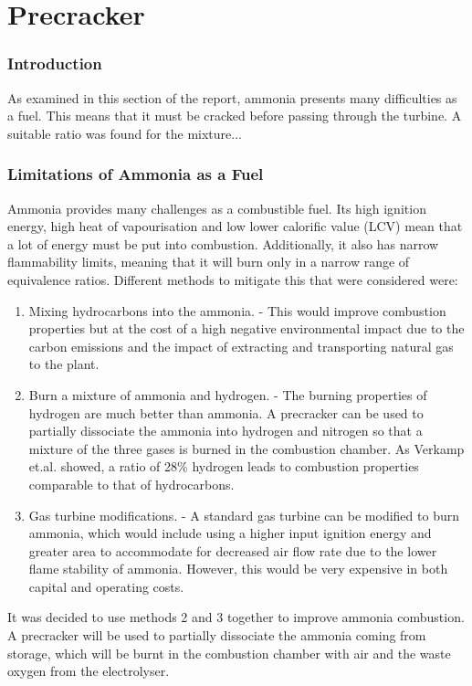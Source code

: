 \documentclass[11pt, oneside]{article}
\begin{document}
\part{Precracker}

\section{Introduction}
As examined in this section of the report, ammonia presents many difficulties as a fuel. This means that it must be cracked before passing through the turbine. A suitable ratio was found for the mixture... %

\section{Limitations of Ammonia as a Fuel \cite{verkamp}}
Ammonia provides many challenges as a combustible fuel. Its high ignition energy, high heat of vapourisation and low lower calorific value (LCV) mean that a lot of energy must be put into combustion. Additionally, it also has narrow flammability limits, meaning that it will burn only in a narrow range of equivalence ratios.  Different methods to mitigate this that were considered were:
\begin {enumerate}
\item Mixing hydrocarbons into the ammonia. - This would improve combustion properties but at the cost of a high negative environmental impact due to the carbon emissions and the impact of extracting and transporting natural gas to the plant. 
\item Burn a mixture of ammonia and hydrogen. - The burning properties of hydrogen are much better than ammonia. A precracker can be used to partially dissociate the ammonia into hydrogen and nitrogen so that a mixture of the three gases is burned in the combustion chamber. As Verkamp et.al. showed, a ratio of 28\% hydrogen leads to combustion properties comparable to that of hydrocarbons. 
\item Gas turbine modifications. - A standard gas turbine can be modified to burn ammonia, which would include using a higher input ignition energy and greater area to accommodate for decreased air flow rate due to the lower flame stability of ammonia. However, this would be very expensive in both capital and operating costs.
\end {enumerate}

It was decided to use methods 2 and 3 together to improve ammonia combustion. A precracker will be used to partially dissociate the ammonia coming from storage, which will be burnt in the combustion chamber with air and the waste oxygen from the electrolyser.
\end{document}
